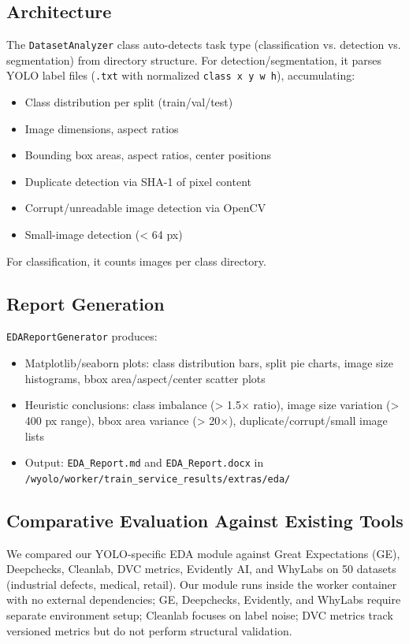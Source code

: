 \documentclass[10pt,twocolumn,letterpaper]{article}
\begin{document}
\subsection{Architecture}
The \texttt{DatasetAnalyzer} class auto-detects task type (classification vs. detection vs. segmentation) from directory structure. For detection/segmentation, it parses YOLO label files (\texttt{.txt} with normalized \texttt{class x y w h}), accumulating:
\begin{itemize}
    \item Class distribution per split (train/val/test)
    \item Image dimensions, aspect ratios
    \item Bounding box areas, aspect ratios, center positions
    \item Duplicate detection via SHA-1 of pixel content
    \item Corrupt/unreadable image detection via OpenCV
    \item Small-image detection (< 64 px)
\end{itemize}
For classification, it counts images per class directory.

\subsection{Report Generation}
\texttt{EDAReportGenerator} produces:
\begin{itemize}
    \item Matplotlib/seaborn plots: class distribution bars, split pie charts, image size histograms, bbox area/aspect/center scatter plots
    \item Heuristic conclusions: class imbalance (> 1.5$\times$ ratio), image size variation (> 400 px range), bbox area variance (> 20$\times$), duplicate/corrupt/small image lists
    \item Output: \texttt{EDA\_Report.md} and \texttt{EDA\_Report.docx} in \texttt{/wyolo/worker/train\_service\_results/extras/eda/}
\end{itemize}

\subsection{Comparative Evaluation Against Existing Tools}
We compared our YOLO-specific EDA module against Great Expectations (GE), Deepchecks, Cleanlab, DVC metrics, Evidently AI, and WhyLabs on 50 datasets (industrial defects, medical, retail). Our module runs inside the worker container with no external dependencies; GE, Deepchecks, Evidently, and WhyLabs require separate environment setup; Cleanlab focuses on label noise; DVC metrics track versioned metrics but do not perform structural validation.
\end{document}
